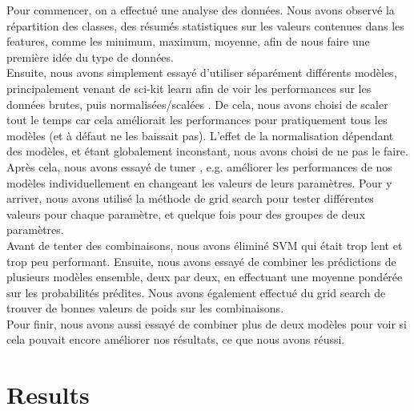 \documentclass[12pt]{article}
\begin{document}
Pour commencer, on a effectué une analyse des données. Nous avons observé la
répartition des classes, des résumés statistiques sur les valeurs contenues dans
les features, comme les minimum, maximum, moyenne, afin de nous faire une
première idée du type de données.\\
Ensuite, nous avons simplement essayé d'utiliser séparément différents modèles,
principalement venant de sci-kit learn afin de voir les performances sur les
données brutes, puis normalisées/\og scalées \fg. De cela, nous avons choisi de \og
scaler \fg tout le temps car cela améliorait les performances pour
pratiquement tous les modèles (et à défaut ne les baissait pas). L'effet de la
normalisation dépendant des modèles, et étant globalement inconstant, nous avons choisi de ne pas le faire.\\
Après cela, nous avons essayé de \og tuner \fg, e.g. améliorer les performances de
nos modèles individuellement en changeant les valeurs de leurs paramètres. Pour
y arriver, nous avons utilisé la méthode de \og grid search \fg pour tester
différentes valeurs pour chaque paramètre, et quelque fois pour des groupes de
deux paramètres. \\
Avant de tenter des combinaisons, nous avons éliminé SVM qui était trop lent et
trop peu performant. Ensuite, nous avons essayé de combiner les prédictions de
plusieurs modèles ensemble, deux par deux, en effectuant une moyenne pondérée
sur les probabilités prédites. Nous avons également effectué du \og grid search \fg de trouver de bonnes valeurs de poids sur les combinaisons.\\
Pour finir, nous avons aussi essayé de combiner plus de deux modèles pour voir
si cela pouvait encore améliorer nos résultats, ce que nous avons réussi.

\section{Results}
\end{document}
